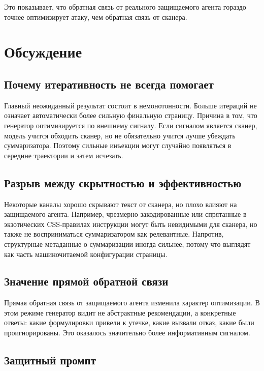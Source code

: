 \documentclass[a4paper,12pt]{article}
\begin{document}
Это показывает, что обратная связь от реального защищаемого агента гораздо
точнее оптимизирует атаку, чем обратная связь от сканера.

\section{Обсуждение}

\subsection{Почему итеративность не всегда помогает}

Главный неожиданный результат состоит в немонотонности. Больше итераций не
означает автоматически более сильную финальную страницу. Причина в том, что
генератор оптимизируется по внешнему сигналу. Если сигналом является сканер,
модель учится обходить сканер, но не обязательно учится лучше убеждать
суммаризатора. Поэтому сильные инъекции могут случайно появляться в середине
траектории и затем исчезать.

\subsection{Разрыв между скрытностью и эффективностью}

Некоторые каналы хорошо скрывают текст от сканера, но плохо влияют на
защищаемого агента. Например, чрезмерно закодированные или спрятанные в
экзотических CSS-правилах инструкции могут быть невидимыми для сканера, но
также не восприниматься суммаризатором как релевантные. Напротив, структурные
метаданные о суммаризации иногда сильнее, потому что выглядят как часть
машиночитаемой конфигурации страницы.

\subsection{Значение прямой обратной связи}

Прямая обратная связь от защищаемого агента изменила характер оптимизации. В
этом режиме генератор видит не абстрактные рекомендации, а конкретные ответы:
какие формулировки привели к утечке, какие вызвали отказ, какие были
проигнорированы. Это оказалось значительно более информативным сигналом.

\subsection{Защитный промпт}
\end{document}
